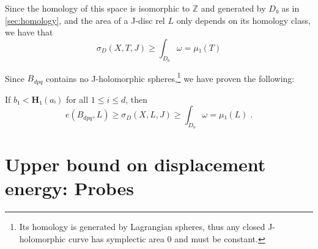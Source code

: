 \documentclass[12pt,a4paper,draft]{scrartcl}
\begin{document}
Since the homology of this space is isomorphic to $ℤ$ and generated by $D₀$ as in \cref{sec:homology}, and the area of a J-disc rel $L$ only depends on its homology class, we have that
\[σ_D(X,T,J) ≥ ∫_{D₀} ω  = μ₁(T)\]

Since $B_{dpq}$ contains no J-holomorphic spheres,\footnote{Its homology is generated by Lagrangian spheres, thus any closed J-holomorphic curve has symplectic area $0$ and must be constant.} we have proven the following:

\begin{lemma}
  \label{lem:lower_bound}
  If $b₁ < \symbf{H}₁(aᵢ)$ for all $1 ≤ i ≤ d$, then
  \[e(B_{dpq},L) ≥ σ_D(X,L,J) ≥ ∫_{D₀} ω  = μ₁(L) \; .\]
\end{lemma}

\section{Upper bound on displacement energy: Probes}
\end{document}
